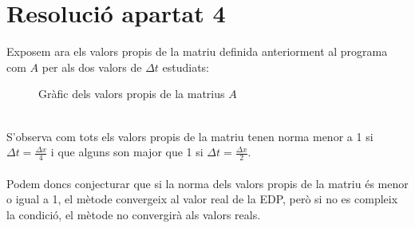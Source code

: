 \documentclass[a4paper, 11pt]{article}
\begin{document}
\section{Resolució apartat 4}
Exposem ara els valors propis de la matriu definida anteriorment al programa com $A$ per als dos valors de $\Delta t$ estudiats:
\begin{figure}[h]
\captionsetup[subfigure]{labelformat=empty}
\centering
   \caption{Gràfic dels valors propis de la matrius $A$}
\end{figure}\\
S'observa com tots els valors propis de la matriu tenen norma menor a 1 si $\Delta t = \frac{\Delta x}{4}$ i que alguns son major que 1 si $\Delta t = \frac{\Delta x}{2}$.\\\\
Podem doncs conjecturar que si la norma dels valors propis de la matriu és menor o igual a 1, el mètode convergeix al valor real de la EDP, però si no es compleix la condició, el mètode no convergirà als valors reals.
\end{document}
